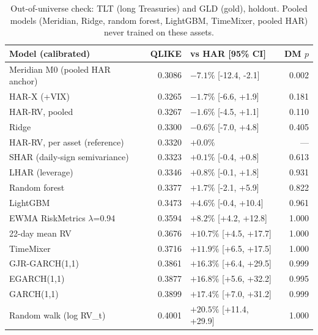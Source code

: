 \begin{table}[!htbp]
\centering
\scriptsize
\caption{Out-of-universe check: TLT (long Treasuries) and GLD (gold), holdout. Pooled models (Meridian, Ridge, random forest, LightGBM, TimeMixer, pooled HAR) never trained on these assets.}
\label{tab:volbreadth}
\begin{tabularx}{\linewidth}{Xrlr}
\toprule
\textbf{Model (calibrated)} & \textbf{QLIKE} & \textbf{vs HAR [95\% CI]} & \textbf{DM $p$} \\
\midrule
\rowcolor{good}Meridian M0 (pooled HAR anchor) & 0.3086 & $-7.1\%$ [-12.4, -2.1] & 0.002 \\
HAR-X (+VIX) & 0.3265 & $-1.7\%$ [-6.6, +1.9] & 0.181 \\
HAR-RV, pooled & 0.3267 & $-1.6\%$ [-4.5, +1.1] & 0.110 \\
Ridge & 0.3300 & $-0.6\%$ [-7.0, +4.8] & 0.405 \\
HAR-RV, per asset (reference) & 0.3320 & $+0.0\%$  & --- \\
SHAR (daily-sign semivariance) & 0.3323 & $+0.1\%$ [-0.4, +0.8] & 0.613 \\
LHAR (leverage) & 0.3346 & $+0.8\%$ [-0.1, +1.8] & 0.931 \\
Random forest & 0.3377 & $+1.7\%$ [-2.1, +5.9] & 0.822 \\
LightGBM & 0.3473 & $+4.6\%$ [-0.4, +10.4] & 0.961 \\
EWMA RiskMetrics $\lambda$=0.94 & 0.3594 & $+8.2\%$ [+4.2, +12.8] & 1.000 \\
22-day mean RV & 0.3676 & $+10.7\%$ [+4.5, +17.7] & 1.000 \\
TimeMixer & 0.3716 & $+11.9\%$ [+6.5, +17.5] & 1.000 \\
GJR-GARCH(1,1) & 0.3861 & $+16.3\%$ [+6.4, +29.5] & 0.999 \\
EGARCH(1,1) & 0.3877 & $+16.8\%$ [+5.6, +32.2] & 0.995 \\
GARCH(1,1) & 0.3899 & $+17.4\%$ [+7.0, +31.2] & 0.999 \\
Random walk (log RV\_t) & 0.4001 & $+20.5\%$ [+11.4, +29.9] & 1.000 \\
\bottomrule
\end{tabularx}
\end{table}
